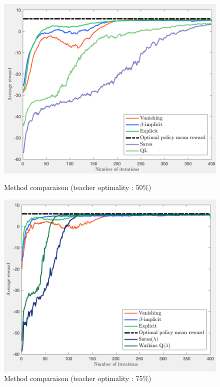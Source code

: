 \documentclass[a4paper]{report}
\begin{document}
{{{				\begin{figure}[ht!]
					\begin{minipage}{0.5\linewidth}
						\includegraphics[width=\linewidth]{loner_comp_50}
						\caption{Method comparaison (teacher optimality : 50\%)}
						\label{fig::loner_comp_50}
					\end{minipage}
					\begin{minipage}{0.5\linewidth}
						\includegraphics[width=\linewidth]{loner_comp_120}
						\caption{Method comparaison (teacher optimality : 75\%)}
						\label{fig::loner_comp_120}
					\end{minipage}
				\end{figure}
		}
	}
	
}
\end{document}
